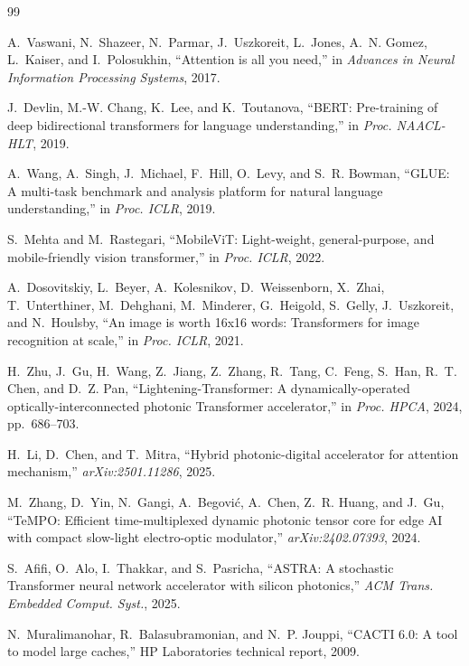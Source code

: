\documentclass[10pt,journal]{IEEEtran}
\begin{document}
\begin{thebibliography}{99}

A.~Vaswani, N.~Shazeer, N.~Parmar, J.~Uszkoreit, L.~Jones,
A.~N. Gomez, L.~Kaiser, and I.~Polosukhin,
``Attention is all you need,''
in \emph{Advances in Neural Information Processing Systems}, 2017.

J.~Devlin, M.-W. Chang, K.~Lee, and K.~Toutanova,
``BERT: Pre-training of deep bidirectional transformers for language
understanding,''
in \emph{Proc. NAACL-HLT}, 2019.

A.~Wang, A.~Singh, J.~Michael, F.~Hill, O.~Levy, and S.~R. Bowman,
``GLUE: A multi-task benchmark and analysis platform for natural language
understanding,''
in \emph{Proc. ICLR}, 2019.

S.~Mehta and M.~Rastegari,
``MobileViT: Light-weight, general-purpose, and mobile-friendly vision
transformer,''
in \emph{Proc. ICLR}, 2022.

A.~Dosovitskiy, L.~Beyer, A.~Kolesnikov, D.~Weissenborn, X.~Zhai,
T.~Unterthiner, M.~Dehghani, M.~Minderer, G.~Heigold, S.~Gelly,
J.~Uszkoreit, and N.~Houlsby,
``An image is worth 16x16 words: Transformers for image recognition at
scale,''
in \emph{Proc. ICLR}, 2021.

H.~Zhu, J.~Gu, H.~Wang, Z.~Jiang, Z.~Zhang, R.~Tang, C.~Feng,
S.~Han, R.~T. Chen, and D.~Z. Pan,
``Lightening-Transformer: A dynamically-operated optically-interconnected
photonic Transformer accelerator,''
in \emph{Proc. HPCA}, 2024, pp.~686--703.

H.~Li, D.~Chen, and T.~Mitra,
``Hybrid photonic-digital accelerator for attention mechanism,''
\emph{arXiv:2501.11286}, 2025.

M.~Zhang, D.~Yin, N.~Gangi, A.~Begovi{\'c}, A.~Chen,
Z.~R. Huang, and J.~Gu,
``TeMPO: Efficient time-multiplexed dynamic photonic tensor core for edge AI
with compact slow-light electro-optic modulator,''
\emph{arXiv:2402.07393}, 2024.

S.~Afifi, O.~Alo, I.~Thakkar, and S.~Pasricha,
``ASTRA: A stochastic Transformer neural network accelerator with silicon
photonics,''
\emph{ACM Trans. Embedded Comput. Syst.}, 2025.

N.~Muralimanohar, R.~Balasubramonian, and N.~P. Jouppi,
``CACTI 6.0: A tool to model large caches,''
HP Laboratories technical report, 2009.


\end{thebibliography}
\end{document}
